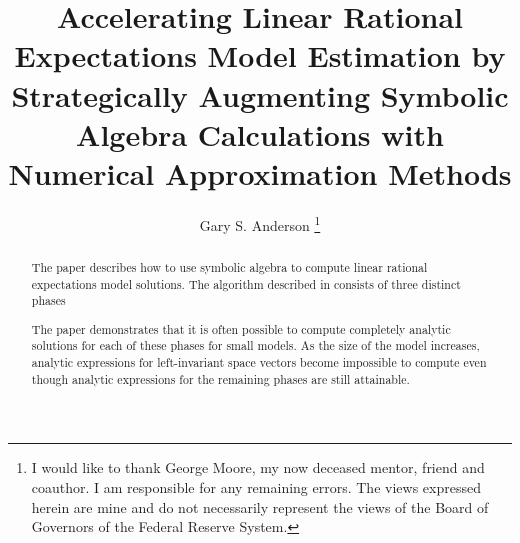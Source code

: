 \documentclass[12pt]{article}
\begin{document}
\title{ Accelerating Linear Rational Expectations Model Estimation by
Strategically Augmenting Symbolic Algebra Calculations with Numerical Approximation Methods}

\author{Gary S. Anderson
\thanks{I would like to thank George Moore, my now deceased mentor,
friend and coauthor.%
I am responsible for
any remaining errors.
The views expressed herein are mine and 
do not necessarily represent the views of the Board of Governors of the Federal
Reserve System.
}}

\maketitle



\makeatletter
\def\fullpath{\begingroup\everyeof{\noexpand}\@sanitize
  \edef\x{\@@input|"find `pwd` -name \jobname.tex" }%
  \edef\x{\endgroup\noexpand\zap@space\x\noexpand\@empty}\x}
\makeatother



\begin{abstract}
\noindent



The paper describes how to use symbolic algebra to compute 
linear rational expectations model solutions.
The algorithm described in\cite{anderson10} consists of three distinct phases%

The paper demonstrates that it is often possible to 
compute completely analytic solutions for each of these phases for small models.
As the size of the model increases, analytic expressions for 
left-invariant space vectors become impossible to compute
even though analytic expressions for the
remaining phases are still attainable.


\end{abstract}
\end{document}

